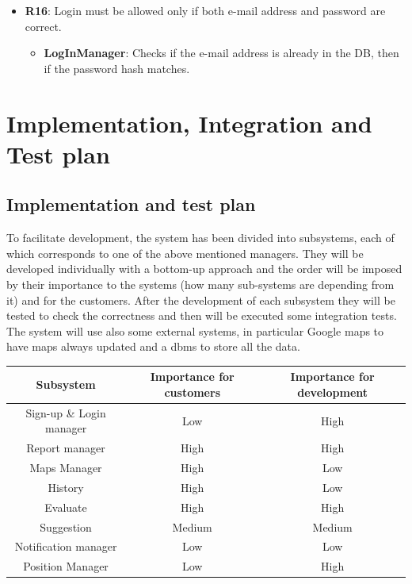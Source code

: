 \documentclass[12pt,a4paper]{report}
\begin{document}
\begin{itemize}
	\item\textbf{R16}: Login must be allowed only if both e-mail address and password are correct.
		\begin{itemize}
		\item\textbf{LogInManager}: Checks if the e-mail address is already in the DB, then if the password hash matches.
		\end{itemize}
	\end{itemize}

	\chapter{Implementation, Integration and Test plan}
		\section{Implementation and test plan}
			To facilitate development, the system has been divided into subsystems, each of which corresponds to one of the
			above mentioned managers. They will be developed individually with a bottom-up approach and the order will be
			imposed by their importance to the systems (how many sub-systems are depending from it) and for the customers.
			After the development of each subsystem they will be tested to check the correctness and then will be executed
			some integration tests. The system will use also some external systems, in particular Google maps to have maps
			always updated and a dbms to store all the data.
			\begin{table}[H]
				\centering
				\begin{tabular}[width = \textwidth, position = center]{|c|c|c|}
					\hline
					Subsystem & Importance for customers & Importance for development\\
					\hline
					\hline
					Sign-up \& Login manager & Low & High\\
					\hline
					Report manager & High & High\\
					\hline
					Maps Manager & High & Low\\
					\hline
					History & High & Low\\
					\hline
					Evaluate & High & High\\
					\hline
					Suggestion & Medium & Medium\\
					\hline
					Notification manager & Low & Low\\
					\hline
					Position Manager & Low & High\\
					\hline
				\end{tabular}
				\label{tab: }
			\end{table}
\end{document}
